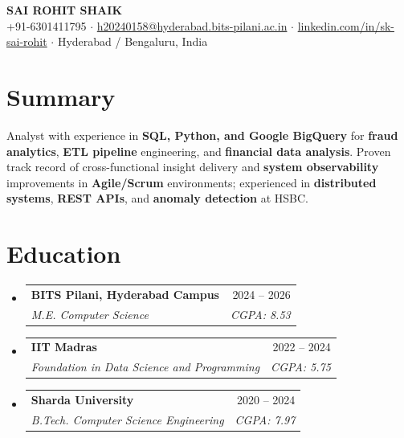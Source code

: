 \documentclass[letterpaper,10.5pt]{article}
\makeatletter
\newcommand{\resumeSubheading}[4]{
\vspace{-2pt}\item
\begin{tabular*}{0.97\textwidth}[t]{l@{\extracolsep{\fill}}r}
\textbf{#1} & \small #2 \\
\textit{\small #3} & \textit{\small #4} \\
\end{tabular*}\vspace{-7pt}
}
\newcommand{\resumeSubHeadingListStart}{\begin{itemize}[leftmargin=0.12in, label={}]}
\newcommand{\resumeSubHeadingListEnd}{\end{itemize}}
\makeatother
\begin{document}
\begin{center}
{\LARGE \textbf{SAI ROHIT SHAIK}} \\[2pt]
\small +91-6301411795 \;$\cdot$\;
\href{mailto:h20240158@hyderabad.bits-pilani.ac.in}{h20240158@hyderabad.bits-pilani.ac.in} \;$\cdot$\;
\href{https://linkedin.com/in/sk-sai-rohit}{linkedin.com/in/sk-sai-rohit} \;$\cdot$\;
Hyderabad / Bengaluru, India
\end{center}
\vspace{-10pt}

\section{Summary}
\begin{itemize}[leftmargin=0.12in, label={}]
\small{\item{
Analyst with experience in \textbf{SQL, Python, and Google BigQuery} for \textbf{fraud analytics}, \textbf{ETL pipeline} engineering, and \textbf{financial data analysis}. Proven track record of cross-functional insight delivery and \textbf{system observability} improvements in \textbf{Agile/Scrum} environments; experienced in \textbf{distributed systems}, \textbf{REST APIs}, and \textbf{anomaly detection} at HSBC.
}}
\end{itemize}\vspace{-10pt}

\section{Education}
\resumeSubHeadingListStart
\resumeSubheading
{BITS Pilani, Hyderabad Campus}{2024 -- 2026}
{M.E. Computer Science}{CGPA: 8.53}
\resumeSubheading
{IIT Madras}{2022 -- 2024}
{Foundation in Data Science and Programming}{CGPA: 5.75}
\resumeSubheading
{Sharda University}{2020 -- 2024}
{B.Tech. Computer Science Engineering}{CGPA: 7.97}
\resumeSubHeadingListEnd\vspace{-4pt}

\end{document}
